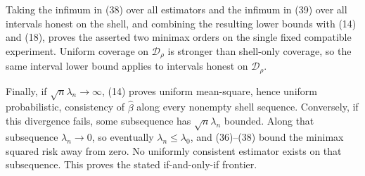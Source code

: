 Taking the infimum in (38) over all estimators and the infimum in (39) over all intervals honest on the shell, and combining the resulting lower bounds with (14) and (18), proves the asserted two minimax orders on the single fixed compatible experiment.  Uniform coverage on \(\mathcal D_\rho\) is stronger than shell-only coverage, so the same interval lower bound applies to intervals honest on \(\mathcal D_\rho\).

Finally, if \(\sqrt n\lambda_n\to\infty\), (14) proves uniform mean-square, hence uniform probabilistic, consistency of \(\widehat\beta\) along every nonempty shell sequence.  Conversely, if this divergence fails, some subsequence has \(\sqrt n\lambda_n\) bounded.  Along that subsequence \(\lambda_n\to0\), so eventually \(\lambda_n\leq\lambda_0\), and (36)--(38) bound the minimax squared risk away from zero.  No uniformly consistent estimator exists on that subsequence.  This proves the stated if-and-only-if frontier.
